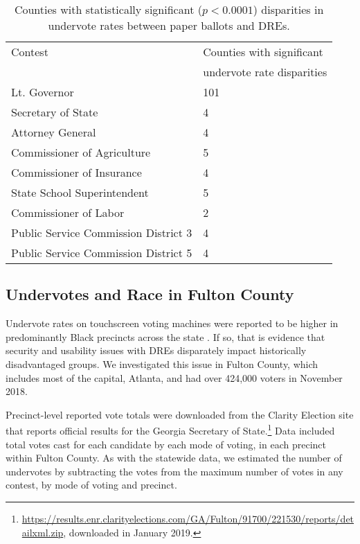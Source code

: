 \documentclass[runningheads]{llncs}
\begin{document}
\begin{table}[ht]
\caption{Counties with statistically significant ($p<0.0001$) disparities in undervote rates between paper ballots and DREs.}
\begin{center}
\begin{tabular}{|l|l|}
Contest						 & Counties with significant \\
             						& undervote rate disparities \\
 \hline
Lt. Governor 					& 101 \\
Secretary of State 				& 4 \\
Attorney General				& 4 \\
Commissioner of Agriculture		& 5 \\
Commissioner of Insurance		& 4 \\
State School Superintendent		& 5 \\
Commissioner of Labor			& 2 \\
Public Service Commission District 3 & 4 \\
Public Service Commission District 5 & 4
\end{tabular}
\end{center}
\label{tab:ltgov}
\end{table}%


\subsection{Undervotes and Race in Fulton County}
Undervote rates on touchscreen voting machines
were reported to be higher in predominantly Black precincts across the state \cite{harriot_thousands_2019}.
If so, that is evidence that security and usability issues with DREs disparately impact
 historically disadvantaged groups.
We investigated this issue in Fulton County, 
which includes most of the capital, Atlanta,
and had over 424,000 voters in November 2018.

Precinct-level reported vote totals were downloaded from the Clarity Election site
that reports official results for the Georgia Secretary of State.\footnote{%
\url{https://results.enr.clarityelections.com/GA/Fulton/91700/221530/reports/detailxml.zip}, downloaded in January 2019.
}
Data included total votes cast for each candidate by each mode of voting, in each precinct within Fulton County.
As with the statewide data, we estimated the number of undervotes by subtracting the votes
from the maximum number of votes in any contest, by mode of voting and precinct.
\end{document}
